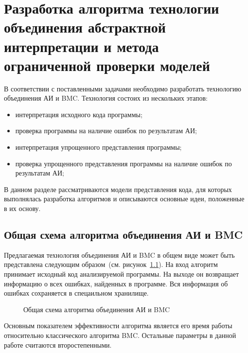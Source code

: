 \chapter{Разработка алгоритма технологии объединения абстрактной интерпретации 
и метода ограниченной проверки моделей}
\label{chapter:algorithm}
В соответствии с поставленными задачами необходимо разработать технологию
объединения АИ и BMC. Технология состоих из нескольких этапов:
\begin{itemize}
\item интерпретация исходного кода программы;
\item проверка программы на наличие ошибок по результатам АИ;
\item интерпретация упрощенного представления программы;
\item проверка упрощенного представления программы на наличие ошибок по 
результатам АИ;
\end{itemize}

В данном разделе рассматриваются модели представления кода, для которых 
выполнялась разработка алгоритмов и описываются основные идеи, положенные в их
основу.

\section{Общая схема алгоритма объединения АИ и BMC}
Предлагаемая технология объединения АИ и BMC в общем виде может быть 
представлена следующим образом~(см. рисунок~\ref{image:algorithmOverview}). На
вход алгоритм принимает исходный код анализируемой программы. На выходе он 
возвращает информацию о всех ошибках, найденных в программе. Вся информация
об ошибках сохраняется в спецаильном хранилище.

\begin{figure}[h!]
\caption{Общая схема алгоритма объединения АИ и BMC}
\label{image:algorithmOverview}
\end{figure}

Основным показателем эффективности алгоритма является его время работы 
относительно классического алгоритма BMC. Остальные параметры в данной работе
считаются второстепенными.

